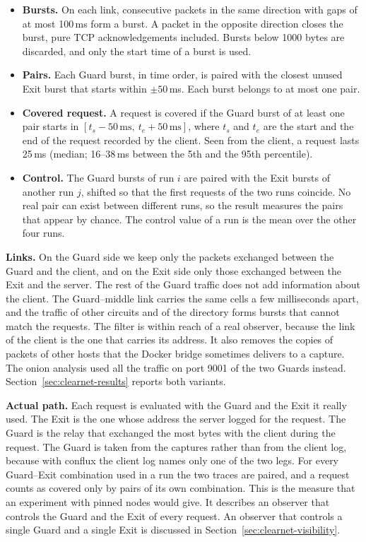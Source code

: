 \documentclass[10pt,a4paper]{article}
\numberwithin{figure}{section}
\numberwithin{table}{section}
\begin{document}
\begin{itemize}
    \item \textbf{Bursts.} On each link, consecutive packets in the same direction
    with gaps of at most 100\,ms form a burst. A packet in the opposite
    direction closes the burst, pure TCP acknowledgements included. Bursts below
    1000 bytes are discarded, and only the start time of a burst is used.
    \item \textbf{Pairs.} Each Guard burst, in time order, is paired with the
    closest unused Exit burst that starts within $\pm 50$\,ms. Each burst belongs
    to at most one pair.
    \item \textbf{Covered request.} A request is covered if the Guard burst of at
    least one pair starts in $[t_s - 50\,\text{ms},\ t_e + 50\,\text{ms}]$, where
    $t_s$ and $t_e$ are the start and the end of the request recorded by the
    client. Seen from the client, a request lasts 25\,ms (median; 16--38\,ms
    between the 5th and the 95th percentile).
    \item \textbf{Control.} The Guard bursts of run $i$ are paired with the Exit
    bursts of another run $j$, shifted so that the first requests of the two runs
    coincide. No real pair can exist between different runs, so the result
    measures the pairs that appear by chance. The control value of a run is the
    mean over the other four runs.
\end{itemize}

\textbf{Links.} On the Guard side we keep only the packets exchanged between the
Guard and the client, and on the Exit side only those exchanged between the Exit
and the server. The rest of the Guard traffic does not add information about the
client. The Guard--middle link carries the same cells a few milliseconds apart,
and the traffic of other circuits and of the directory forms bursts that cannot
match the requests. The filter is within reach of a real observer, because the
link of the client is the one that carries its address. It also removes the
copies of packets of other hosts that the Docker bridge sometimes delivers to a
capture. The onion analysis used all the traffic on port 9001 of the two Guards
instead. Section~\ref{sec:clearnet-results} reports both variants.

\textbf{Actual path.} Each request is evaluated with the Guard and the Exit it
really used. The Exit is the one whose address the server logged for the
request. The Guard is the relay that exchanged the most bytes with the client
during the request. The Guard is taken from the captures rather than from the
client log, because with conflux the client log names only one of the two legs.
For every Guard--Exit combination used in a run the two traces are paired, and a
request counts as covered only by pairs of its own combination. This is the
measure that an experiment with pinned nodes would give. It describes an observer
that controls the Guard and the Exit of every request. An observer that controls
a single Guard and a single Exit is discussed in
Section~\ref{sec:clearnet-visibility}.
\end{document}

